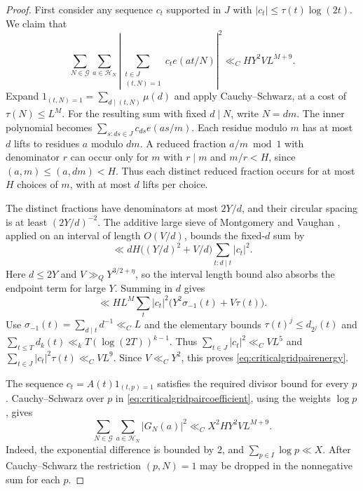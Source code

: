 \documentclass[11pt,a4paper]{article}
\numberwithin{equation}{section}
\begin{document}
\begin{proof}
First consider any sequence $c_t$ supported in $J$
with $|c_t|\le\tau(t)\log(2t)$. We claim that
\begin{equation}
 \sum_{N\in\mathcal G}\sum_{a\in\mathcal H_N}
 \left|\sum_{\substack{t\in J\\(t,N)=1}}c_t e(at/N)\right|^2
 \ll_C H Y^2 V L^{M+9}.
 \label{eq:criticalgridpairenergy}
\end{equation}
Expand $1_{(t,N)=1}=\sum_{d\mid(t,N)}\mu(d)$ and
apply Cauchy--Schwarz, at a cost of $\tau(N)\le L^M$.
For the resulting sum with fixed $d\mid N$, write $N=dm$.
The inner polynomial becomes $\sum_{s:ds\in J}c_{ds}e(as/m)$.
Each residue modulo $m$ has at most $d$ lifts to residues $a$
modulo $dm$. A reduced fraction $a/m\bmod 1$ with denominator
$r$ can occur only for $m$ with $r\mid m$ and $m/r<H$, since
$(a,m)\le(a,dm)<H$. Thus each distinct reduced fraction occurs
for at most $H$ choices of $m$, with at most $d$ lifts per choice.

The distinct fractions have denominators at most $2Y/d$,
and their circular spacing is at least $(2Y/d)^{-2}$.
The additive large sieve of Montgomery and Vaughan
\cite{MontgomeryVaughanSieve}, applied on an interval of
length $O(V/d)$, bounds the fixed-$d$ sum by
\[
 \ll dH\bigl((Y/d)^2+V/d\bigr)\sum_{t:d\mid t}|c_t|^2.
\]
Here $d\le2Y$ and $V\gg_Q Y^{3/2+\eta}$, so the interval
length bound also absorbs the endpoint term for large $Y$.
Summing in $d$ gives
\[
 \ll H L^M \sum_t |c_t|^2\bigl(Y^2\sigma_{-1}(t)+V\tau(t)\bigr).
\]
Use $\sigma_{-1}(t)=\sum_{d\mid t}d^{-1}\ll_C L$ and
the elementary bounds $\tau(t)^j\le d_{2^j}(t)$ and
$\sum_{t\le T}d_k(t)\ll_k T(\log(2T))^{k-1}$.
Thus $\sum_{t\in J}|c_t|^2\ll_C V L^5$ and
$\sum_{t\in J}|c_t|^2\tau(t)\ll_C V L^9$. Since $V\ll_C Y^2$,
this proves \cref{eq:criticalgridpairenergy}.

The sequence $c_t=A(t)1_{(t,p)=1}$ satisfies the required
divisor bound for every $p$. Cauchy--Schwarz over $p$ in
\cref{eq:criticalgridpaircoefficient}, using the weights
$\log p$, gives
\begin{equation}
  \sum_{N\in\mathcal G}\sum_{a\in\mathcal H_N}|G_N(a)|^2
  \ll_C X^2 H Y^2 V L^{M+9}.
 \label{eq:criticalgridpairsignedenergy}
\end{equation}
Indeed, the exponential difference is bounded by $2$, and
$\sum_{p\in I}\log p\ll X$. After Cauchy--Schwarz the
restriction $(p,N)=1$ may be dropped in the nonnegative
sum for each $p$.


\end{proof}
\end{document}
